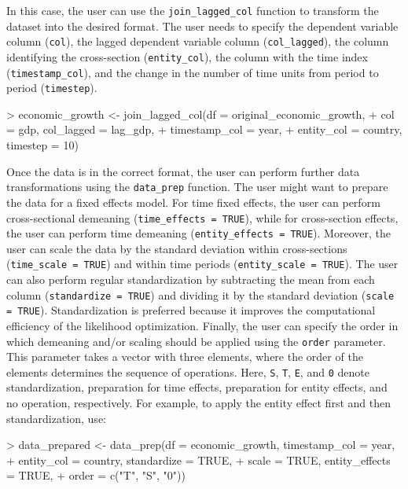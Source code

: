 \documentclass[a4paper]{article}
\begin{document}
In this case, the user can use the \verb+join_lagged_col+ function to transform the dataset into the desired format.
The user needs to specify the dependent variable column (\verb+col+), the lagged dependent variable column (\verb+col_lagged+), the column identifying the cross-section (\verb+entity_col+), the column with the time index (\verb+timestamp_col+), and the change in the number of time units from period to period (\verb+timestep+).

\begin{Schunk}
\begin{Sinput}
> economic_growth <- join_lagged_col(df = original_economic_growth,
+                         col = gdp, col_lagged = lag_gdp,
+                         timestamp_col = year,
+                         entity_col = country, timestep = 10)
\end{Sinput}
\end{Schunk}

Once the data is in the correct format, the user can perform further data transformations using the \verb+data_prep+ function.
The user might want to prepare the data for a fixed effects model.
For time fixed effects, the user can perform cross-sectional demeaning (\verb+time_effects = TRUE+), while for cross-section effects, the user can perform time demeaning (\verb+entity_effects = TRUE+).
Moreover, the user can scale the data by the standard deviation within cross-sections (\verb+time_scale = TRUE+) and within time periods (\verb+entity_scale = TRUE+).
The user can also perform regular standardization by subtracting the mean from each column (\verb+standardize = TRUE+) and dividing it by the standard deviation (\verb+scale = TRUE+).
Standardization is preferred because it improves the computational efficiency of the likelihood optimization.
Finally, the user can specify the order in which demeaning and/or scaling should be applied using the \verb+order+ parameter.
This parameter takes a vector with three elements, where the order of the elements determines the sequence of operations.
Here, \texttt{S}, \texttt{T}, \texttt{E}, and \texttt{0} denote standardization, preparation for time effects, preparation for entity effects, and no operation, respectively.
For example, to apply the entity effect first and then standardization, use:

\begin{Schunk}
\begin{Sinput}
> data_prepared <- data_prep(df = economic_growth, timestamp_col = year,
+                            entity_col = country, standardize = TRUE,
+                            scale = TRUE, entity_effects = TRUE,
+                            order = c("T", "S", "0"))
\end{Sinput}
\end{Schunk}
\end{document}
